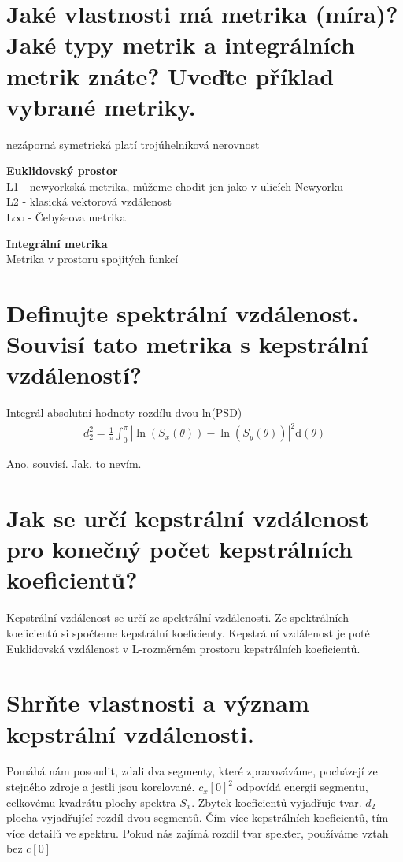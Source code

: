 \documentclass[a4paper,12pt]{article}   %
\newcommand{\mt}[1]{$#1$}
\newcommand{\dd}{\text{d}}
\begin{document}
\section{Jaké vlastnosti má metrika (míra)? Jaké typy metrik a integrálních metrik znáte? Uveďte příklad vybrané metriky.}
\begin{outline}
        \1 nezáporná
        \1 symetrická
        \1 platí trojúhelníková nerovnost
\end{outline}

\textbf{Euklidovský prostor}\\
L1 - newyorkská metrika, můžeme chodit jen jako v ulicích Newyorku\\
L2 - klasická vektorová vzdálenost\\
L\mt{\infty} - Čebyšeova metrika

\textbf{Integrální metrika}\\
Metrika v prostoru spojitých funkcí


\section{Definujte spektrální vzdálenost. Souvisí tato metrika s kepstrální vzdáleností?} 
Integrál absolutní hodnoty rozdílu dvou ln(PSD)
\begin{align*}
        d_2^2 = \frac{1}{\pi} \int _0^\pi |\ln(S_x(\theta)) - \ln(S_y(\theta))|^2\dd (\theta)
\end{align*}

Ano, souvisí. Jak, to nevím.


\section{Jak se určí kepstrální vzdálenost pro konečný počet kepstrálních koeficientů?}

Kepstrální vzdálenost se určí ze spektrální vzdálenosti. Ze spektrálních koeficientů si spočteme kepstrální koeficienty. Kepstrální vzdálenost je poté Euklidovská vzdálenost v L-rozměrném prostoru kepstrálních koeficientů.


\section{Shrňte vlastnosti a význam kepstrální vzdálenosti.}
\begin{outline}
        \1 Pomáhá nám posoudit, zdali dva segmenty, které zpracováváme, pocházejí ze stejného zdroje a jestli jsou korelované.
        \1 \mt{c_x[0]^2} odpovídá energii segmentu, celkovému kvadrátu plochy spektra \mt{S_x}. Zbytek koeficientů vyjadřuje tvar. 
        \1 \mt{d_2} plocha vyjadřující rozdíl dvou segmentů. 
        \1 Čím více kepstrálních koeficientů, tím více detailů ve spektru. 
        \1 Pokud nás zajímá rozdíl tvar spekter, používáme vztah bez \mt{c[0]}
\end{outline}
\end{document}
